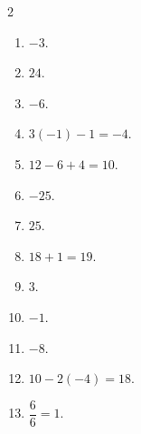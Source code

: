 \documentclass[11pt]{article}
\begin{document}
\begin{keybox}
\begin{multicols}{2}
\small
\begin{enumerate}[leftmargin=*,itemsep=3pt]
  \item $-3$.
  \item $24$.
  \item $-6$.
  \item $3(-1)-1=-4$.
  \item $12-6+4=10$.
  \item $-25$.
  \item $25$.
  \item $18+1=19$.
  \item $3$.
  \item $-1$.
  \item $-8$.
  \item $10-2(-4)=18$.
  \item $\dfrac{6}{6}=1$.
\end{enumerate}
\end{multicols}
\end{keybox}
\end{document}
